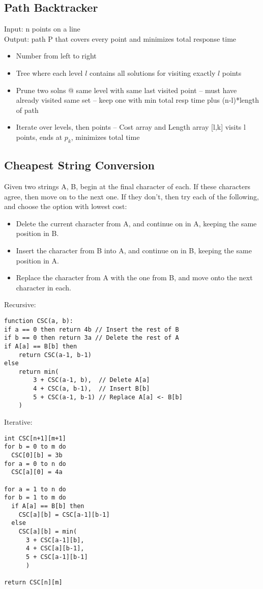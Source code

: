 \documentclass[12pt]{article}
\providecommand{\tightlist}{
    \setlength{\itemsep}{0pt}\setlength{\parskip}{0pt}
}
\begin{document}
\subsection{Path Backtracker}
Input: n points on a line\\
Output: path P that covers every point and minimizes total response time
\begin{itemize}
  \item Number from left to right
  \item Tree where each level $l$ contains all solutions for visiting exactly $l$ points
  \item Prune two solns @ same level with same last visited point -- must have already visited same set -- keep one with min total resp time plus (n-l)*length of path
  \item Iterate over levels, then points -- Cost array and Length array [l,k] visits l points, ends at $p_k$, minimizes total time
\end{itemize}



\subsection{Cheapest String Conversion}
Given two strings A, B, begin at the final character of each.
If these characters agree, then move on to the next one.
If they don't, then try each of the following, and choose the option with lowest cost:
\begin{itemize}\tightlist
    \item Delete the current character from A, and continue on in A, keeping the same position in B.
    \item Insert the character from B into A, and continue on in B, keeping the same position in A.
    \item Replace the character from A with the one from B, and move onto the next character in each.
\end{itemize}
Recursive:
\begin{lstlisting}
function CSC(a, b):
if a == 0 then return 4b // Insert the rest of B
if b == 0 then return 3a // Delete the rest of A
if A[a] == B[b] then
    return CSC(a-1, b-1)
else
    return min(
        3 + CSC(a-1, b),  // Delete A[a]
        4 + CSC(a, b-1),  // Insert B[b]
        5 + CSC(a-1, b-1) // Replace A[a] <- B[b]
    )
\end{lstlisting}

Iterative:
\begin{lstlisting}
int CSC[n+1][m+1]
for b = 0 to m do
  CSC[0][b] = 3b
for a = 0 to n do
  CSC[a][0] = 4a

for a = 1 to n do
for b = 1 to m do
  if A[a] == B[b] then
    CSC[a][b] = CSC[a-1][b-1]
  else
    CSC[a][b] = min(
      3 + CSC[a-1][b],
      4 + CSC[a][b-1],
      5 + CSC[a-1][b-1]
      )

return CSC[n][m]
\end{lstlisting}
\end{document}
